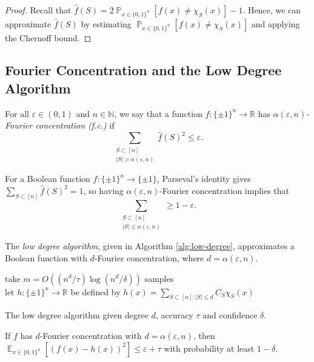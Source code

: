 \documentclass[letterpaper, reqno,11pt]{article}
\newcommand{\RR}{\mathbb{R}}
\newcommand{\NN}{\mathbb{N}}
\newcommand{\PP}{\mathop{{}\mathbb{P}}}
\newcommand{\EE}{\mathop{{}\mathbb{E}}}
\DeclareMathOperator{\sign}{sign}
\begin{document}
\begin{proof}
  Recall that $\hat{f}(S) = 2\PP_{x \in \{ 0, 1 \}^n}[f(x) \neq \chi_S(x)] - 1$. Hence, we can approximate $\hat{f}(S)$ by estimating $\PP_{x \in \{ 0, 1 \}^n}[f(x) \neq \chi_S(x)]$ and applying the Chernoff bound.
\end{proof}

\subsection{Fourier Concentration and the Low Degree Algorithm}

\begin{definition}
  For all $\varepsilon \in (0, 1)$ and $n \in \NN$, we say that a function $f : \{ \pm 1 \}^n \to \RR$ has \emph{$\alpha(\varepsilon, n)$-Fourier concentration (f.c.)} if
  $$ \sum_{\substack{S \subset [n] \\ |S| > \alpha(\varepsilon, n)}} \hat{f}(S)^2 \leq \varepsilon. $$
\end{definition}

For a Boolean function $f : \{ \pm 1 \}^n \to \{ \pm 1 \}$, Parseval's identity gives $\sum_{S \subset [n]} \hat{f}(S)^2 = 1$, so having $\alpha(\varepsilon, n)$-Fourier concentration implies that
$$ \sum_{\substack{S \subset [n] \\ |S| \leq \alpha(\varepsilon, n)}} \geq 1 - \varepsilon. $$

The \emph{low degree algorithm}, given in Algorithm \ref{alg:low-degree}, approximates a Boolean function with $d$-Fourier concentration, where $d = \alpha(\varepsilon, n)$.

\begin{algorithm}
  take $m = O((n^d/\tau) \log (n^d/\delta))$ samples \\
  let $h : \{ \pm 1 \}^n \to \RR$ be defined by $h(x) = \sum_{S \subset [n] : |S| \leq d} C_S \chi_S(x)$ \\
  \Return{$\sign \circ h$ as hypothesis}
  \caption{The low degree algorithm given degree $d$, accuracy $\tau$ and confidence $\delta$.}
  \label{alg:low-degree}
\end{algorithm}

\begin{proposition} \label{prop:expectation}
  If $f$ has $d$-Fourier concentration with $d = \alpha(\varepsilon, n)$, then $\EE_{x \in \{ 0, 1 \}^n} [(f(x) - h(x))^2] \leq \varepsilon + \tau$ with probability at least $1 - \delta$.
\end{proposition}
\end{document}
